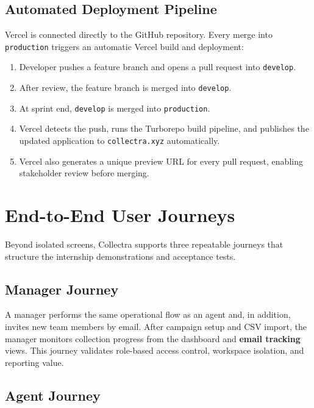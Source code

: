 \documentclass[12pt,a4paper]{report}
\begin{document}
\subsection{Automated Deployment Pipeline}

Vercel is connected directly to the GitHub repository.
Every merge into \texttt{production} triggers an automatic Vercel build and
deployment:

\begin{enumerate}
  \item Developer pushes a feature branch and opens a pull request into
        \texttt{develop}.
  \item After review, the feature branch is merged into \texttt{develop}.
  \item At sprint end, \texttt{develop} is merged into \texttt{production}.
  \item Vercel detects the push, runs the Turborepo build pipeline, and publishes
        the updated application to \texttt{collectra.xyz} automatically.
  \item Vercel also generates a unique preview URL for every pull request, enabling
        stakeholder review before merging.
\end{enumerate}

\section{End-to-End User Journeys}
\label{sec:user-journeys}

Beyond isolated screens, Collectra supports three repeatable journeys that structure
the internship demonstrations and acceptance tests.

\subsection{Manager Journey}

A manager performs the same operational flow as an agent and, in addition, invites
new team members by email.
After campaign setup and CSV import, the manager monitors collection progress from
the dashboard and \textbf{email tracking} views.
This journey validates role-based access control, workspace isolation, and reporting
value.

\subsection{Agent Journey}
\end{document}
